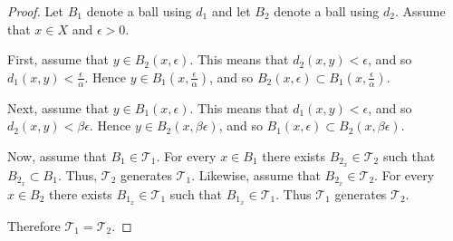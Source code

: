 \documentclass[letterpaper,12pt,fleqn]{article}
\newcommand{\T}{\mathscr{T}}
\renewcommand{\a}{\alpha}
\renewcommand{\b}{\beta}
\newcommand{\e}{\epsilon}
\begin{document}
\begin{proof}
  Let \(B_1\) denote a ball using \(d_1\) and let \(B_2\) denote a ball using \(d_2\).  Assume that \(x\in X\) and
  \(\e>0\).

  First, assume that \(y\in B_2(x,\e)\).  This means that \(d_2(x,y)<\e\), and so \(d_1(x,y)<\frac{\e}{\a}\).
  Hence \(y\in B_1\left(x,\frac{\e}{\a}\right)\), and so \(B_2(x,\e)\subset B_1\left(x,\frac{\e}{\a}\right)\).

  Next, assume that \(y\in B_1(x,\e)\).  This means that \(d_1(x,y)<\e\), and so \(d_2(x,y)<\b\e\).  Hence
  \(y\in B_2(x,\b\e)\), and so \(B_1(x,\e)\subset B_2(x,\b\e)\).

  Now, assume that \(B_1\in\T_1\).  For every \(x\in B_1\) there exists \(B_{2_x}\in\T_2\) such that
  \(B_{2_x}\subset B_1\).  Thus, \(\T_2\) generates \(\T_1\).  Likewise, assume that \(B_{2_x}\in\T_2\).  For every
  \(x\in B_2\) there exists \(B_{1_x}\in\T_1\) such that \(B_{1_x}\in\T_1\).  Thus \(\T_1\) generates \(\T_2\).

  Therefore \(\T_1=\T_2\).
\end{proof}
\end{document}

